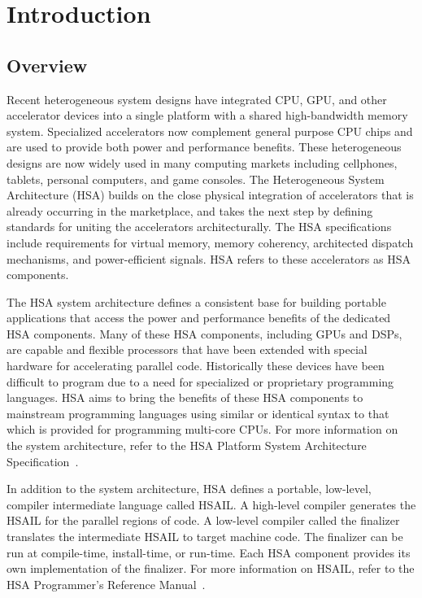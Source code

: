 \documentclass[final,oneside]{book}
\begin{document}
\clearpage
{}
\setcounter{page}{1}

\chapter{Introduction} \label{index}
\vspace{-7mm}
\section{Overview}\label{overview}
\vspace{-3mm}
Recent heterogeneous system designs have integrated CPU, GPU, and other
accelerator devices into a single platform with a shared high-bandwidth memory
system.  Specialized accelerators now complement general purpose CPU chips and
are used to provide both power and performance benefits.  These
heterogeneous designs are now widely used in many computing markets including
cellphones, tablets, personal computers, and game consoles. The Heterogeneous
System Architecture (HSA) builds on the close physical integration of
accelerators that is already occurring in the marketplace, and takes the next
step by defining standards for uniting the accelerators architecturally. The HSA
specifications include requirements for virtual memory, memory coherency,
architected dispatch mechanisms, and power-efficient signals. HSA refers to
these accelerators as HSA components.

The HSA system architecture defines a consistent base for building portable
applications that access the power and performance benefits of the dedicated HSA
components. Many of these HSA components, including GPUs and DSPs, are capable and
flexible processors that have been extended with special hardware for
accelerating parallel code. Historically these devices have been difficult to
program due to a need for specialized or proprietary programming languages. HSA
aims to bring the benefits of these HSA components to mainstream programming
languages using similar or identical syntax to that which is provided for
programming multi-core CPUs. For more information on the system architecture,
refer to the HSA Platform System Architecture Specification~\cite{sar}.

In addition to the system architecture, HSA defines a portable, low-level,
compiler intermediate language called HSAIL.  A high-level compiler
generates the HSAIL for the parallel regions of code. A low-level compiler
called the finalizer translates the intermediate HSAIL to target machine
code. The finalizer can be run at compile-time, install-time, or run-time. Each
HSA component provides its own implementation of the finalizer.  For more
information on HSAIL, refer to the HSA Programmer's Reference Manual~\cite{prm}.
\end{document}
